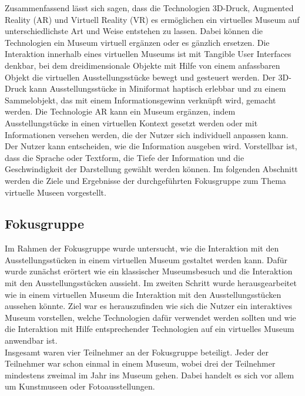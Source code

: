 \documentclass[runningheads,a4paper]{llncs}
\begin{document}
Zusammenfassend lässt sich sagen, dass die Technologien 3D-Druck, Augmented Reality (AR) und Virtuell Reality (VR) es ermöglichen ein virtuelles Museum auf unterschiedlichste Art und Weise entstehen zu lassen. Dabei können die Technologien ein Museum virtuell ergänzen oder es gänzlich ersetzen. Die Interaktion innerhalb eines virtuellen Museums ist mit Tangible User Interfaces denkbar, bei dem dreidimensionale Objekte mit Hilfe von einem anfassbaren Objekt die virtuellen Ausstellungsstücke bewegt und gesteuert werden. Der 3D-Druck kann Ausstellungsstücke in Miniformat haptisch erlebbar und zu einem Sammelobjekt, das mit einem Informationsgewinn verknüpft wird, gemacht werden. Die Technologie AR kann ein Museum ergänzen, indem Ausstellungstücke in einen virtuellen Kontext gesetzt werden oder mit Informationen versehen werden, die der Nutzer sich individuell anpassen kann. Der Nutzer kann entscheiden, wie die Information ausgeben wird. Vorstellbar ist, dass die Sprache oder Textform, die Tiefe der Information und die Geschwindigkeit der Darstellung gewählt werden können. Im folgenden Abschnitt werden die Ziele und Ergebnisse der durchgeführten Fokusgruppe zum Thema virtuelle Museen vorgestellt.\\

\subsection{Fokusgruppe}
Im Rahmen der Fokusgruppe wurde untersucht, wie die Interaktion mit den Ausstellungsstücken in einem virtuellen Museum gestaltet werden kann. Dafür wurde zunächst erörtert wie ein klassischer Museumsbesuch und die Interaktion mit den Ausstellungsstücken aussieht. Im zweiten Schritt wurde herausgearbeitet wie in einem virtuellen Museum die Interaktion mit den Ausstellungsstücken aussehen könnte. Ziel war es herauszufinden wie sich die Nutzer ein interaktives Museum vorstellen, welche Technologien dafür verwendet werden sollten und wie die Interaktion mit Hilfe entsprechender Technologien auf ein virtuelles Museum anwendbar ist.\\

Insgesamt waren vier Teilnehmer an der Fokusgruppe beteiligt. Jeder der Teilnehmer war schon einmal in einem Museum, wobei drei der Teilnehmer mindestens zweimal im Jahr ins Museum gehen. Dabei handelt es sich vor allem um Kunstmuseen oder Fotoausstellungen.\\
\end{document}
